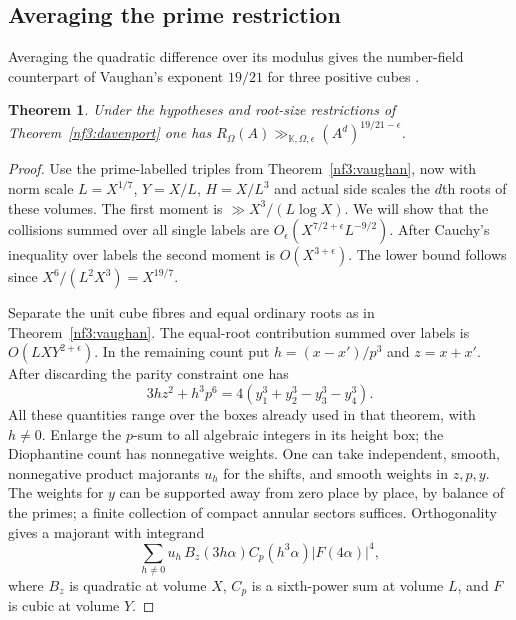 \documentclass[11pt,letterpaper]{article}
\newtheorem{theorem}{Theorem}[section]
\theoremstyle{definition}
\numberwithin{equation}{section}
\begin{document}
\subsection{Averaging the prime restriction}\label{nf3:averaged}
Averaging the quadratic difference over its modulus gives the
number-field counterpart of Vaughan's exponent $19/21$ for three
positive cubes \cite{nf3:vaughan86}.
\begin{theorem}\label{nf3:nineteen}
Under the hypotheses and root-size restrictions of
Theorem~\ref{nf3:davenport} one has
$R_\Omega(A)\gg_{\mathbb K,\Omega,\epsilon}(A^d)^{19/21-\epsilon}$.
\end{theorem}
\begin{proof}
Use the prime-labelled triples from Theorem~\ref{nf3:vaughan}, now
with norm scale $L=X^{1/7}$, $Y=X/L$, $H=X/L^3$ and actual side
scales the $d$th roots of these volumes. The first moment is
$\gg X^3/(L\log X)$. We will show that the collisions summed over all
single labels are $O_\epsilon(X^{7/2+\epsilon}L^{-9/2})$. After Cauchy's
inequality over labels the second moment is $O(X^{3+\epsilon})$.
The lower bound follows since $X^{6}/(L^2X^3)=X^{19/7}$.

Separate the unit cube fibres and equal ordinary roots as in
Theorem~\ref{nf3:vaughan}. The equal-root contribution summed over
labels is $O(LXY^{2+\epsilon})$. In the remaining count put
$h=(x-x')/p^3$ and $z=x+x'$. After discarding the parity constraint
one has
\[
             3hz^2+h^3p^6=4(y_1^3+y_2^3-y_3^3-y_4^3).
\]
All these quantities range over the boxes already used in that theorem,
with $h\ne0$. Enlarge the $p$-sum to all algebraic integers in its
height box; the Diophantine count has nonnegative weights. One can take
independent, smooth, nonnegative product majorants $u_h$ for the shifts,
and smooth weights in $z,p,y$. The weights for $y$ can be supported away
from zero place by place, by balance of the primes; a finite collection
of compact annular sectors suffices. Orthogonality gives a majorant
with integrand
\[
    \sum_{h\ne0} u_h\, B_z(3h\alpha) C_p(h^3\alpha)|F(4\alpha)|^4 ,
\]
where $B_z$ is quadratic at volume $X$, $C_p$ is a sixth-power sum at
volume $L$, and $F$ is cubic at volume $Y$.


\end{proof}
\end{document}
